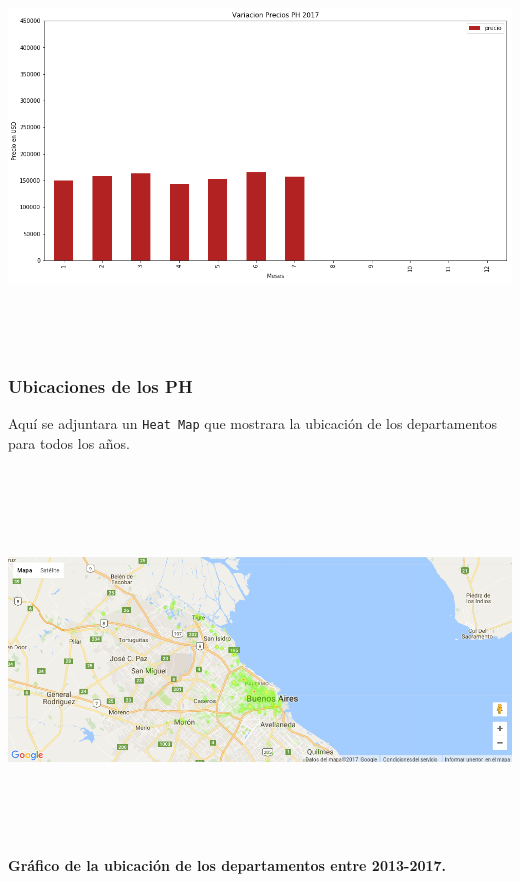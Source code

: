 \documentclass[a4paper, 10pt]{article}
\def\code#1{\texttt{#1}}
\newcommand\tab[1][0.5cm]{\hspace*{#1}}
\begin{document}
    \begin{center}
          \includegraphics[width=6in, height=4.2in]{images/vPH2017}
    \end{center}

  \subsubsection{Ubicaciones de los PH}

    \tab Aquí se adjuntara un \code{Heat Map} que mostrara la ubicación de los departamentos para todos los años.

    \begin{center}
          \includegraphics[width=7in, height=4in]{images/ubicDeptos}
          \textbf{Gráfico de la ubicación de los departamentos entre 2013-2017.}
    \end{center}
\end{document}
